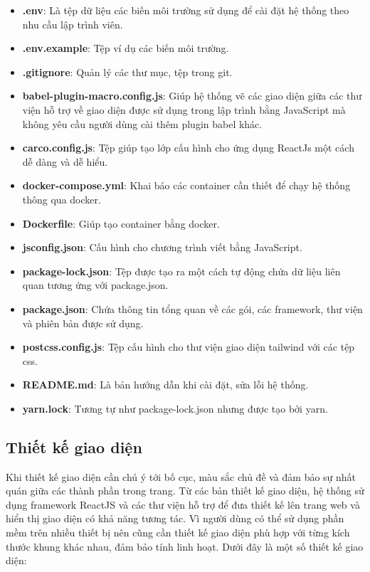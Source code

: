 \documentclass[./../main.tex]{subfiles}
\begin{document}
\begin{itemize}
    \item \textbf{.env}: Là tệp dữ liệu các biến môi trường sử dụng để cài đặt hệ thống theo nhu cầu lập trình viên.
    \item \textbf{.env.example}: Tệp ví dụ các biến môi trường.
    \item \textbf{.gitignore}: Quản lý các thư mục, tệp trong git.
    \item \textbf{babel-plugin-macro.config.js}: Giúp hệ thống vẽ các giao diện giữa các thư viện hỗ trợ về giao diện được sử dụng trong lập trình bằng JavaScript mà không yêu cầu người dùng cài thêm plugin babel khác.
    \item \textbf{carco.config.js}: Tệp giúp tạo lớp cấu hình cho ứng dụng ReactJs một cách dễ dàng và dễ hiểu.
    \item \textbf{docker-compose.yml}: Khai báo các container cần thiết để chạy hệ thống thông qua docker.
    \item \textbf{Dockerfile}: Giúp tạo container bằng docker.
    \item \textbf{jsconfig.json}: Cấu hình cho chương trình viết bằng JavaScript.
    \item \textbf{package-lock.json}: Tệp được tạo ra một cách tự động chứa dữ liệu liên quan tương ứng với package.json.
    \item \textbf{package.json}: Chứa thông tin tổng quan về các gói, các framework, thư viện và phiên bản được sử dụng.
    \item \textbf{postcss.config.js}: Tệp cấu hình cho thư viện giao diện tailwind với các tệp css.
    \item \textbf{README.md}: Là bản hướng dẫn khi cài đặt, sửa lỗi hệ thống.
    \item \textbf{yarn.lock}: Tương tự như package-lock.json nhưng được tạo bởi yarn.
\end{itemize}

\subsection{Thiết kế giao diện}
Khi thiết kế giao diện cần chú ý tới bố cục, màu sắc chủ đề và đảm bảo sự nhất quán giữa các thành phần trong trang. Từ các bản thiết kế giao diện, hệ thống sử dụng framework ReactJS và các thư viện hỗ trợ để đưa thiết kế lên trang web và hiển thị giao diện có khả năng tương tác. Vì người dùng có thể sử dụng phần mềm trên nhiều thiết bị nên cũng cần thiết kế giao diện phù hợp với từng kích thước khung khác nhau, đảm bảo tính linh hoạt. Dưới đây là một số thiết kế giao diện:
\end{document}
